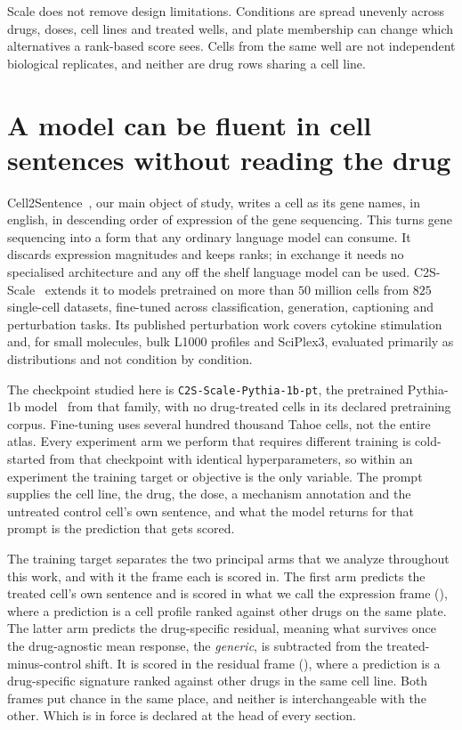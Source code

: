 Scale does not remove design limitations. Conditions are spread unevenly across
drugs, doses, cell lines and treated wells, and plate membership can change
which alternatives a rank-based score sees. Cells from the same well are not
independent biological replicates, and neither are drug rows sharing a cell
line. 

\section{A model can be fluent in cell sentences without reading the drug}
\label{sec:intro-model}

Cell2Sentence~\cite{c2s}, our main object of study, writes a cell as its gene names, in english, in descending order of
expression of the gene sequencing. This turns gene sequencing into a form that any ordinary language model can
consume. It discards expression
magnitudes and keeps ranks; in exchange it needs no specialised architecture and any off the shelf language model can be used.
C2S-Scale~\cite{c2sscale} extends it to models pretrained on more than $50$
million cells from $825$ single-cell datasets, fine-tuned across
classification, generation, captioning and perturbation tasks. Its published
perturbation work covers cytokine stimulation and, for small molecules, bulk
L1000 profiles and SciPlex3, evaluated primarily as distributions and not
condition by condition.

The checkpoint studied here is
\texttt{C2S-Scale-}\allowbreak\texttt{Pythia-}\allowbreak\texttt{1b-pt}, the
pretrained Pythia-1b model~\cite{pythia} from that family, with no drug-treated
cells in its declared pretraining corpus. Fine-tuning uses several hundred
thousand Tahoe cells, not the entire atlas. Every experiment arm we perform that requires different training is cold-started from that
checkpoint with identical hyperparameters, so within an experiment the training
target or objective is the only variable. The prompt supplies the cell line, the
drug, the dose, a mechanism annotation and the untreated control cell's own
sentence, and what the model returns for that prompt is the prediction that gets
scored.

The training target separates the two principal arms that we analyze throughout this work, and with it the frame each
is scored in. The first arm predicts the treated cell's own sentence and is
scored in what we call the expression frame (\Eframe), where a prediction is a cell profile
ranked against other drugs on the same plate. The latter arm predicts the
drug-specific residual, meaning what survives once the drug-agnostic mean
response, the \emph{generic}, is subtracted from the treated-minus-control
shift. It is scored in the residual frame (\Rframe), where a prediction is a
drug-specific signature ranked against other drugs in the same cell line. Both
frames put chance in the same place, and neither is interchangeable with the
other. Which is in force is declared at the head of every section.

